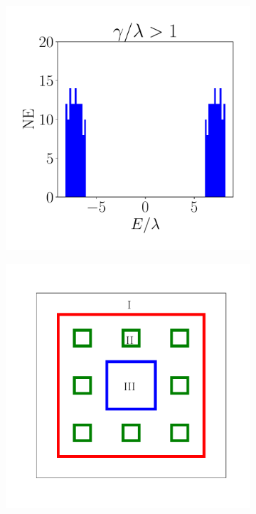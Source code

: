 \begin{figure}[h!]
\begin{subfigure}[b!]{0.25 \textwidth}
     \end{subfigure}\hspace*{-0.5em} 
     \begin{subfigure}[b!]{0.25 \textwidth}
         \caption{}
         \includegraphics[width=\textwidth]{Imagenes/Resultados_Hoti_Fractal/bars_square3.pdf}
     \end{subfigure}\hspace*{-0.5em} 
     \begin{subfigure}[b!]{0.25 \textwidth}
        \caption{}
        \includegraphics[width=\textwidth]{Imagenes/Models/sierpinski_carpet_color.pdf}

\end{subfigure}
\end{figure}
